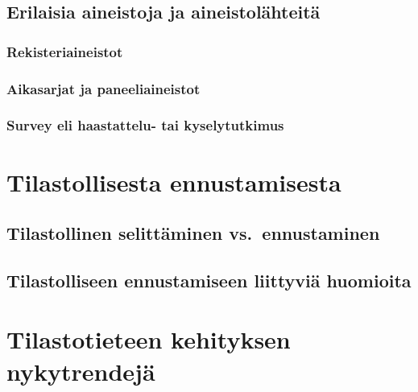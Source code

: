 \documentclass[
]{book}
\begin{document}
\hypertarget{alaluku103}{%
\section{Erilaisia aineistoja ja aineistolähteitä}\label{alaluku103}}

\hypertarget{alaluku104}{%
\subsection{Rekisteriaineistot}\label{alaluku104}}

\hypertarget{alaluku105}{%
\subsection{Aikasarjat ja paneeliaineistot}\label{alaluku105}}

\hypertarget{alaluku106}{%
\subsection{Survey eli haastattelu- tai kyselytutkimus}\label{alaluku106}}

\hypertarget{luku11}{%
\chapter{Tilastollisesta ennustamisesta}\label{luku11}}

\hypertarget{alaluku111}{%
\section{Tilastollinen selittäminen vs.~ennustaminen}\label{alaluku111}}

\hypertarget{alaluku112}{%
\section{Tilastolliseen ennustamiseen liittyviä huomioita}\label{alaluku112}}

\hypertarget{luku12}{%
\chapter{Tilastotieteen kehityksen nykytrendejä}\label{luku12}}

  
\end{document}
